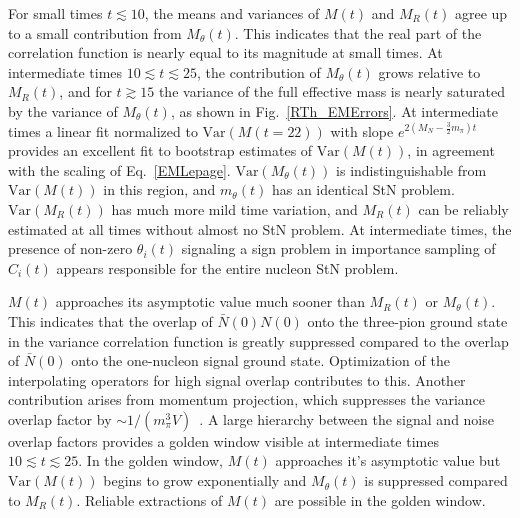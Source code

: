 For small times $t \lesssim 10$, the means and variances of $M(t)$ and $M_R(t)$ agree up to 
a small contribution from  $M_\theta(t)$. 
This indicates that the real part of the correlation function is nearly equal to its magnitude at small times. 
At intermediate times $10 \lesssim t \lesssim 25$, the contribution of $M_\theta(t)$ grows relative to 
$M_R(t)$, and for $t\gtrsim 15$ the variance of the full effective mass is nearly saturated by the variance of 
$M_\theta(t)$, as shown in Fig.~\ref{RTh_EMErrors}. 
At intermediate times a linear fit normalized to $\text{Var}(M(t=22))$ with slope $e^{2(M_N - \frac{3}{2}m_\pi)t}$ 
provides an excellent fit to bootstrap estimates of $\text{Var}(M(t))$, 
in agreement with the scaling of Eq.~\eqref{EMLepage}. $\text{Var}(M_\theta(t))$ is indistinguishable from 
$\text{Var}(M(t))$ in this region, and $m_\theta(t)$ has an identical StN problem. 
$\text{Var}(M_R(t))$ has 
much more mild time variation, and $M_R(t)$ can be reliably estimated at all times without almost no  StN problem. 
At intermediate times, the presence of non-zero $\theta_i(t)$ signaling a sign problem in importance sampling of $C_i(t)$ appears responsible for the entire nucleon StN problem.



$M(t)$ approaches its asymptotic value much sooner than $M_R(t)$ or $M_\theta(t)$. 
This indicates that the overlap of $\bar{N}(0)N(0)$ onto the three-pion ground state in the variance correlation function is greatly 
suppressed compared to the overlap of $\bar{N}(0)$ onto the one-nucleon signal ground state. 
Optimization of the interpolating operators for high signal overlap contributes to this. 
Another contribution arises from momentum projection, which suppresses the variance overlap factor by 
$\sim 1/(m_\pi^3 V)$~\cite{Beane:2009gs}. 
A large hierarchy between the signal and noise overlap factors provides a golden window visible 
at intermediate times $10 \lesssim t \lesssim 25$. 
In the golden window, $M(t)$ approaches it's asymptotic value 
but $\text{Var}(M(t))$  begins to grow exponentially and 
$M_\theta(t)$ is suppressed compared to $M_R(t)$. Reliable extractions of $M(t)$ are possible in the golden window.


